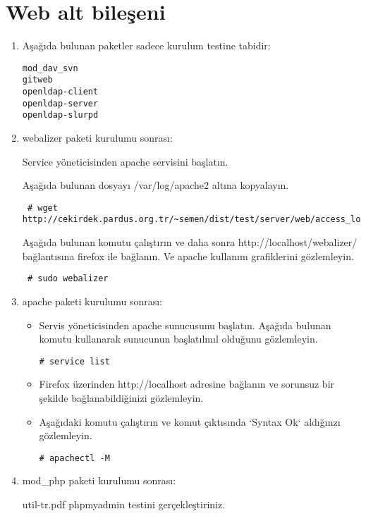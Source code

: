 \documentclass[a4paper,10pt]{article}
\begin{document}
\section{Web alt bileşeni}
\begin{enumerate}
\item Aşağıda bulunan paketler sadece kurulum testine tabidir:
\begin{verbatim}
mod_dav_svn
gitweb
openldap-client
openldap-server
openldap-slurpd
\end{verbatim}

\item webalizer paketi kurulumu sonrası:

Service yöneticisinden apache servisini başlatın.

Aşağıda bulunan dosyayı /var/log/apache2 altına kopyalayın.
\begin{verbatim}
 # wget http://cekirdek.pardus.org.tr/~semen/dist/test/server/web/access_log
\end{verbatim}

Aşağıda bulunan komutu çalıştırın ve daha sonra http://localhost/webalizer/ bağlantısına firefox ile bağlanın. Ve apache kullanım grafiklerini gözlemleyin.
\begin{verbatim}
 # sudo webalizer
\end{verbatim}

\item apache paketi kurulumu sonrası:
\begin{itemize}
\item Servis yöneticisinden apache sunucusunu başlatın. Aşağıda bulunan komutu kullanarak sunucunun başlatılmıl olduğunu gözlemleyin.
\begin{verbatim}
# service list
\end{verbatim}
\item Firefox üzerinden http://localhost adresine bağlanın ve sorunsuz bir şekilde bağlanabildiğinizi gözlemleyin. 
\item Aşağıdaki komutu çalıştırın ve komut çıktısında `Syntax Ok` aldığınzı gözlemleyin.
\begin{verbatim}
# apachectl -M 
\end{verbatim}

\end{itemize}

\item mod\_php paketi kurulumu sonrası:

util-tr.pdf phpmyadmin testini gerçekleştiriniz.

\end{enumerate}
\end{document}
